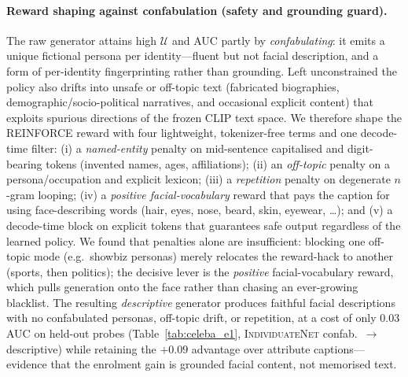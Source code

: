 \documentclass[10pt,twocolumn,letterpaper]{article}
\newcommand{\U}{\mathcal{U}}
\newcommand{\method}{\textsc{IndividuateNet}}
\begin{document}
\paragraph{Reward shaping against confabulation (safety and grounding guard).}
The raw generator attains high $\U$ and AUC partly by \emph{confabulating}: it emits a unique
fictional persona per identity---fluent but not facial description, and a form of per-identity
fingerprinting rather than grounding. Left unconstrained the policy also drifts into unsafe or
off-topic text (fabricated biographies, demographic/socio-political narratives, and occasional
explicit content) that exploits spurious directions of the frozen CLIP text space. We therefore
shape the REINFORCE reward with four lightweight, tokenizer-free terms and one decode-time
filter: (i) a \emph{named-entity} penalty on mid-sentence capitalised and digit-bearing tokens
(invented names, ages, affiliations); (ii) an \emph{off-topic} penalty on a persona/occupation
and explicit lexicon; (iii) a \emph{repetition} penalty on degenerate $n$-gram looping; (iv) a
\emph{positive facial-vocabulary} reward that pays the caption for using face-describing words
(hair, eyes, nose, beard, skin, eyewear, \dots); and (v) a decode-time block on explicit tokens
that guarantees safe output regardless of the learned policy. We found that penalties alone are
insufficient: blocking one off-topic mode (e.g.\ showbiz personas) merely relocates the
reward-hack to another (sports, then politics); the decisive lever is the \emph{positive}
facial-vocabulary reward, which pulls generation onto the face rather than chasing an
ever-growing blacklist. The resulting \emph{descriptive} generator produces faithful facial
descriptions with no confabulated personas, off-topic drift, or repetition, at a cost of only
$0.03$ AUC on held-out probes (Table~\ref{tab:celeba_e1}, \method{} confab.\ $\to$
descriptive) while retaining the $+0.09$ advantage over attribute captions---evidence that the
enrolment gain is grounded facial content, not memorised text.
\end{document}

